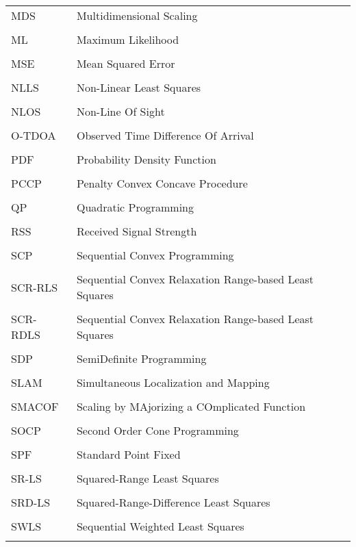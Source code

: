\begin{longtable}[h]{l l}
MDS & Multidimensional Scaling \\ 
\\
ML & Maximum Likelihood \\
\\
MSE & Mean Squared Error\\
\\
NLLS & Non-Linear Least Squares \\
\\
NLOS & Non-Line Of Sight \\
\\
O-TDOA & Observed Time Difference Of Arrival\\
\\
PDF & Probability Density Function \\
\\
PCCP & Penalty Convex Concave Procedure \\
\\
QP & Quadratic Programming \\
\\
RSS & Received Signal Strength \\
\\
SCP & Sequential Convex Programming \\
\\
SCR-RLS & Sequential Convex Relaxation Range-based Least Squares \\
\\
SCR-RDLS & Sequential Convex Relaxation Range-based Least Squares\\
\\
SDP & SemiDefinite Programming \\
\\
SLAM & Simultaneous Localization and Mapping  \\
\\
SMACOF & Scaling by MAjorizing a COmplicated Function \\
\\
SOCP & Second Order Cone Programming \\
\\
SPF & Standard  Point Fixed\\
\\
SR-LS  & Squared-Range Least Squares \\
\\
SRD-LS & Squared-Range-Difference Least Squares \\
\\
SWLS & Sequential Weighted Least Squares \\
\\

\end{longtable}
